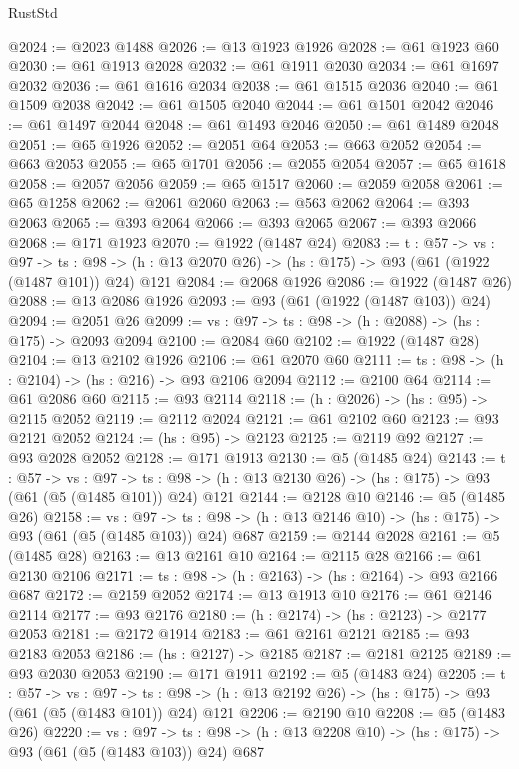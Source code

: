 \begin{lexlean}{RustStd}
\begin{coremodule}
@2024 := @2023 @1488
@2026 := @13 @1923 @1926
@2028 := @61 @1923 @60
@2030 := @61 @1913 @2028
@2032 := @61 @1911 @2030
@2034 := @61 @1697 @2032
@2036 := @61 @1616 @2034
@2038 := @61 @1515 @2036
@2040 := @61 @1509 @2038
@2042 := @61 @1505 @2040
@2044 := @61 @1501 @2042
@2046 := @61 @1497 @2044
@2048 := @61 @1493 @2046
@2050 := @61 @1489 @2048
@2051 := @65 @1926
@2052 := @2051 @64
@2053 := @663 @2052
@2054 := @663 @2053
@2055 := @65 @1701
@2056 := @2055 @2054
@2057 := @65 @1618
@2058 := @2057 @2056
@2059 := @65 @1517
@2060 := @2059 @2058
@2061 := @65 @1258
@2062 := @2061 @2060
@2063 := @563 @2062
@2064 := @393 @2063
@2065 := @393 @2064
@2066 := @393 @2065
@2067 := @393 @2066
@2068 := @171 @1923
@2070 := @1922 (@1487 @24)
@2083 := {t : @57} ->
  {vs : @97} ->
  {ts : @98} -> (h : @13 @2070 @26) -> (hs : @175) -> @93 (@61 (@1922 (@1487 @101)) @24) @121
@2084 := @2068 @1926
@2086 := @1922 (@1487 @26)
@2088 := @13 @2086 @1926
@2093 := @93 (@61 (@1922 (@1487 @103)) @24)
@2094 := @2051 @26
@2099 := {vs : @97} -> {ts : @98} -> (h : @2088) -> (hs : @175) -> @2093 @2094
@2100 := @2084 @60
@2102 := @1922 (@1487 @28)
@2104 := @13 @2102 @1926
@2106 := @61 @2070 @60
@2111 := {ts : @98} -> (h : @2104) -> (hs : @216) -> @93 @2106 @2094
@2112 := @2100 @64
@2114 := @61 @2086 @60
@2115 := @93 @2114
@2118 := (h : @2026) -> (hs : @95) -> @2115 @2052
@2119 := @2112 @2024
@2121 := @61 @2102 @60
@2123 := @93 @2121 @2052
@2124 := (hs : @95) -> @2123
@2125 := @2119 @92
@2127 := @93 @2028 @2052
@2128 := @171 @1913
@2130 := @5 (@1485 @24)
@2143 := {t : @57} ->
  {vs : @97} ->
  {ts : @98} -> (h : @13 @2130 @26) -> (hs : @175) -> @93 (@61 (@5 (@1485 @101)) @24) @121
@2144 := @2128 @10
@2146 := @5 (@1485 @26)
@2158 := {vs : @97} ->
  {ts : @98} -> (h : @13 @2146 @10) -> (hs : @175) -> @93 (@61 (@5 (@1485 @103)) @24) @687
@2159 := @2144 @2028
@2161 := @5 (@1485 @28)
@2163 := @13 @2161 @10
@2164 := @2115 @28
@2166 := @61 @2130 @2106
@2171 := {ts : @98} -> (h : @2163) -> (hs : @2164) -> @93 @2166 @687
@2172 := @2159 @2052
@2174 := @13 @1913 @10
@2176 := @61 @2146 @2114
@2177 := @93 @2176
@2180 := (h : @2174) -> (hs : @2123) -> @2177 @2053
@2181 := @2172 @1914
@2183 := @61 @2161 @2121
@2185 := @93 @2183 @2053
@2186 := (hs : @2127) -> @2185
@2187 := @2181 @2125
@2189 := @93 @2030 @2053
@2190 := @171 @1911
@2192 := @5 (@1483 @24)
@2205 := {t : @57} ->
  {vs : @97} ->
  {ts : @98} -> (h : @13 @2192 @26) -> (hs : @175) -> @93 (@61 (@5 (@1483 @101)) @24) @121
@2206 := @2190 @10
@2208 := @5 (@1483 @26)
@2220 := {vs : @97} ->
  {ts : @98} -> (h : @13 @2208 @10) -> (hs : @175) -> @93 (@61 (@5 (@1483 @103)) @24) @687

\end{coremodule}
\end{lexlean}
